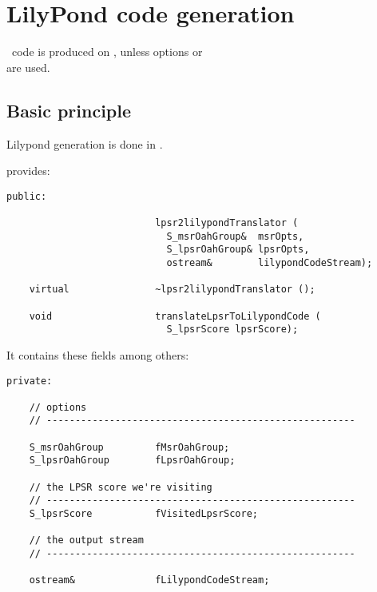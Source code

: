 
\chapter{LilyPond code generation}


\lily\ code is produced on \standardOutput, unless options  or \\
 are used.


\section{Basic principle}

Lilypond generation is done in .

 provides:
\begin{lstlisting}[language=CPlusPlus]
  public:

                          lpsr2lilypondTranslator (
                            S_msrOahGroup&  msrOpts,
                            S_lpsrOahGroup& lpsrOpts,
                            ostream&        lilypondCodeStream);

    virtual               ~lpsr2lilypondTranslator ();

    void                  translateLpsrToLilypondCode (
                            S_lpsrScore lpsrScore);
\end{lstlisting}

It contains these fields among others:
\begin{lstlisting}[language=CPlusPlus]
  private:

    // options
    // ------------------------------------------------------

    S_msrOahGroup         fMsrOahGroup;
    S_lpsrOahGroup        fLpsrOahGroup;

    // the LPSR score we're visiting
    // ------------------------------------------------------
    S_lpsrScore           fVisitedLpsrScore;

    // the output stream
    // ------------------------------------------------------

    ostream&              fLilypondCodeStream;
\end{lstlisting}


